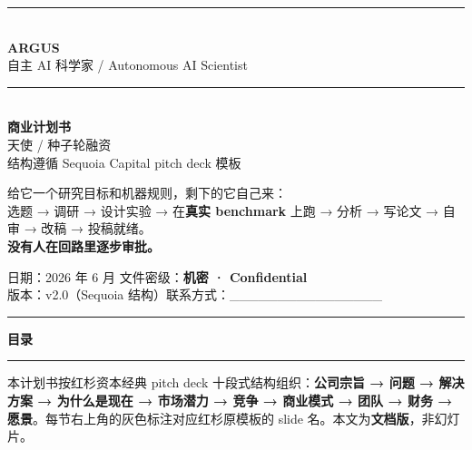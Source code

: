\documentclass[UTF8,11pt,fontset=none]{ctexart}
\begin{document}
\sffamily

\begin{titlepage}
\thispagestyle{empty}
\vspace*{1.2cm}
\begin{flushleft}
{\color{argusline}\rule{\textwidth}{2pt}}\\[1.0cm]
{\sffamily\fontsize{56}{60}\selectfont\bfseries\color{argusnavy} ARGUS}\\[0.3cm]
{\sffamily\Large\color{argusteal} 自主 AI 科学家 \;/\; Autonomous AI Scientist}\\[0.8cm]
{\color{argusline}\rule{\textwidth}{1pt}}\\[1.2cm]

{\sffamily\huge\bfseries\color{argusnavy} 商业计划书}\\[0.5cm]
{\sffamily\Large\color{argusgray} 天使 / 种子轮融资}\\[0.5cm]
{\sffamily\normalsize\color{argusgray} 结构遵循 Sequoia Capital pitch deck 模板}\\[1.6cm]

\begin{quotebox}
{\large 给它一个研究目标和机器规则，剩下的它自己来：\\
选题 → 调研 → 设计实验 → 在\textbf{真实 benchmark} 上跑 → 分析 → 写论文 → 自审 → 改稿 → 投稿就绪。\\[4pt]
\textbf{没有人在回路里逐步审批。}}
\end{quotebox}

\vfill
{\sffamily\color{argusgray}
日期：2026 年 6 月 \hfill 文件密级：\textbf{机密 · Confidential}\\
版本：v2.0（Sequoia 结构）\hfill 联系方式：\_\_\_\_\_\_\_\_\_\_\_\_\_\_\_\_}\\[0.4cm]
{\color{argusline}\rule{\textwidth}{2pt}}
\end{flushleft}
\end{titlepage}

\thispagestyle{empty}
{\sffamily\color{argusnavy}\Large\bfseries 目录}\\[0.3em]
{\color{argusline}\rule{\textwidth}{1pt}}
\vspace{0.4em}
\setcounter{tocdepth}{1}
\tableofcontents
\vfill
\begin{keybox}
\footnotesize 本计划书按红杉资本经典 pitch deck 十段式结构组织：\textbf{公司宗旨 → 问题 → 解决方案 → 为什么是现在 → 市场潜力 → 竞争 → 商业模式 → 团队 → 财务 → 愿景}。每节右上角的灰色标注对应红杉原模板的 slide 名。本文为\textbf{文档版}，非幻灯片。
\end{keybox}
\clearpage
\end{document}
